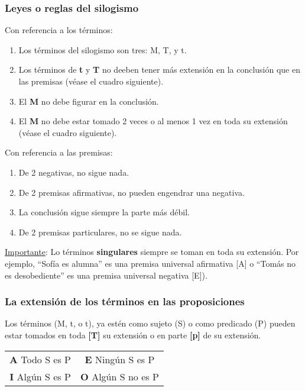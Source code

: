\documentclass{article}
\begin{document}
\subsubsection{Leyes o reglas del silogismo}
Con referencia a los términos:
\begin{enumerate}
    \item Los términos del silogismo son tres: M, T, y t.
    \item Los términos de \textbf{t} y \textbf{T} no deeben tener más extensión en la conclusión que en las premisas (véase el cuadro siguiente).
    \item El \textbf{M} no debe figurar en la conclusión.
    \item El \textbf{M} no debe estar tomado 2 veces o al menos 1 vez en toda su extensión (véase el cuadro siguiente).
\end{enumerate}

Con referencia a las premisas:

\begin{enumerate}[resume]
    \item De 2 negativas, no sigue nada.
    \item De 2 premisas afirmativas, no pueden engendrar una negativa.
    \item La conclusión sigue siempre la parte más débil.
    \item De 2 premisas particulares, no se sigue nada.
\end{enumerate}

\underline{Importante}: Lo términos \textbf{singulares} siempre se toman en toda su extensión. Por ejemplo, ``Sofía es alumna'' es una premisa universal afirmativa [A] o ``Tomás no es desobediente'' es una premisa universal negativa [E]).

\subsubsection{La extensión de los términos en las proposiciones}
Los términos (M, t, o t), ya estén como sujeto (S) o como predicado (P) pueden estar tomados en toda \textbf{[T]} su extensión o en parte \textbf{[p]} de su extensión.

\begin{center}
  \begin{tabular}{cc}
     \textbf{A} Todo S es P & \textbf{E} Ningún S es P  \\
     \textbf{I} Algún S es P & \textbf{O} Algún S no es P \\ 
\end{tabular}{}
\end{center}
\end{document}
